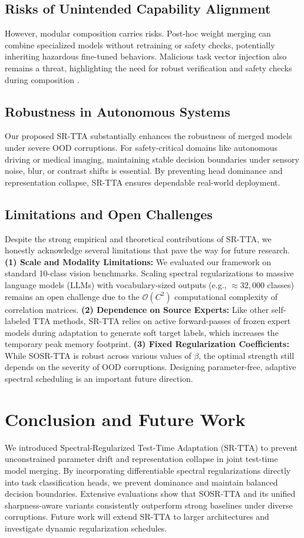 \documentclass{article}
\theoremstyle{plain}
\theoremstyle{definition}
\theoremstyle{remark}
\begin{document}
\subsection{Risks of Unintended Capability Alignment}
However, modular composition carries risks. Post-hoc weight merging can combine specialized models without retraining or safety checks, potentially inheriting hazardous fine-tuned behaviors. Malicious task vector injection also remains a threat, highlighting the need for robust verification and safety checks during composition \cite{yang2024model,yu2024language}.

\subsection{Robustness in Autonomous Systems}
Our proposed SR-TTA substantially enhances the robustness of merged models under severe OOD corruptions. For safety-critical domains like autonomous driving or medical imaging, maintaining stable decision boundaries under sensory noise, blur, or contrast shifts is essential. By preventing head dominance and representation collapse, SR-TTA ensures dependable real-world deployment.

\subsection{Limitations and Open Challenges}
Despite the strong empirical and theoretical contributions of SR-TTA, we honestly acknowledge several limitations that pave the way for future research.
\textbf{(1) Scale and Modality Limitations:} We evaluated our framework on standard 10-class vision benchmarks. Scaling spectral regularizations to massive language models (LLMs) with vocabulary-sized outputs (e.g., $\approx 32,000$ classes) remains an open challenge due to the $\mathcal{O}(C^2)$ computational complexity of correlation matrices.
\textbf{(2) Dependence on Source Experts:} Like other self-labeled TTA methods, SR-TTA relies on active forward-passes of frozen expert models during adaptation to generate soft target labels, which increases the temporary peak memory footprint.
\textbf{(3) Fixed Regularization Coefficients:} While SOSR-TTA is robust across various values of $\beta$, the optimal strength still depends on the severity of OOD corruptions. Designing parameter-free, adaptive spectral scheduling is an important future direction.

\section{Conclusion and Future Work}
\label{sec:conclusion_future}
We introduced Spectral-Regularized Test-Time Adaptation (SR-TTA) to prevent unconstrained parameter drift and representation collapse in joint test-time model merging. By incorporating differentiable spectral regularizations directly into task classification heads, we prevent dominance and maintain balanced decision boundaries. Extensive evaluations show that SOSR-TTA and its unified sharpness-aware variants consistently outperform strong baselines under diverse corruptions. Future work will extend SR-TTA to larger architectures and investigate dynamic regularization schedules.
\end{document}
